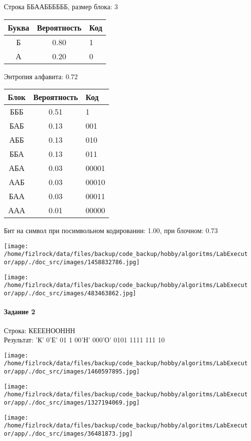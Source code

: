 \documentclass[a4paper, 12pt]{article}
\begin{document}
Строка ББААББББББ, размер блока: 3
\begin{center}
 \begin{tabular}{ |c|c|l| } 
  \hline
     Буква & Вероятность & Код\\ \hline
Б & 0.80 & 1\\\hline
А & 0.20 & 0
\\ \hline \end{tabular}
\end{center}
Энтропия алфавита: 0.72
\begin{center}
 \begin{tabular}{ |c|c|l| } 
  \hline
     Блок & Вероятность & Код\\ \hline
БББ & 0.51 & 1\\\hline
БАБ & 0.13 & 001\\\hline
АББ & 0.13 & 010\\\hline
ББА & 0.13 & 011\\\hline
АБА & 0.03 & 00001\\\hline
ААБ & 0.03 & 00010\\\hline
БАА & 0.03 & 00011\\\hline
ААА & 0.01 & 00000
\\ \hline \end{tabular}
\end{center}
Бит на символ при посимвольном кодировании: 1.00, при блочном: 0.73

\texttt{[image: /home/fizlrock/data/files/backup/code\_backup/hobby/algoritms/LabExecutor/app/./doc\_src/images/1458832786.jpg]}

\texttt{[image: /home/fizlrock/data/files/backup/code\_backup/hobby/algoritms/LabExecutor/app/./doc\_src/images/483463862.jpg]}
\pagebreak
\paragraph{Задание 2}

Строка: 
КЕЕЕНООННН\\
Результат: 'К' 0'Е' 01 1 00'Н' 000'О' 0101 1111 111 10

\texttt{[image: /home/fizlrock/data/files/backup/code\_backup/hobby/algoritms/LabExecutor/app/./doc\_src/images/1460597895.jpg]}

\texttt{[image: /home/fizlrock/data/files/backup/code\_backup/hobby/algoritms/LabExecutor/app/./doc\_src/images/1327194069.jpg]}

\texttt{[image: /home/fizlrock/data/files/backup/code\_backup/hobby/algoritms/LabExecutor/app/./doc\_src/images/36481873.jpg]}
\end{document}

